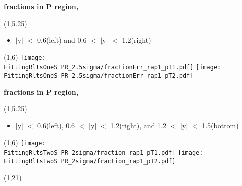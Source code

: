 \documentclass[11pt,slidescentered,red,compress,handout,hyperref={bookmarks=true},mathseriftable]{beamer}
\newcommand{\FittingRltsOneS}{../Psi1S/Fit/parameter/evaluateCtau/}
\newcommand{\FittingRltsTwoS}{../Psi2S/Fit/parameter/evaluateCtau/}
\begin{document}
\begin{frame}[t]{\small \bf fractions in P region,  }{}
\begin{textblock}{48}(1,5.25)
\begin{itemize}
\scriptsize \item  $|$y$|$ $<$ 0.6(left) and 0.6 $<$ $|$y$|$ $<$ 1.2(right)
\end{itemize}
\end{textblock}
\begin{textblock}{48}(1,6)
\hspace*{10pt} \texttt{[image: \\FittingRltsOneS PR\_2.5sigma/fractionErr\_rap1\_pT1.pdf]}
\hspace*{10pt} \texttt{[image: \\FittingRltsOneS PR\_2.5sigma/fractionErr\_rap1\_pT2.pdf]}
\end{textblock}
\end{frame}

\begin{frame}[t]{\small \bf fractions in P region,  }{}
\begin{textblock}{48}(1,5.25)
\begin{itemize}
\scriptsize \item  $|$y$|$ $<$ 0.6(left), 0.6 $<$ $|$y$|$ $<$ 1.2(right), and 1.2 $<$ $|$y$|$ $<$ 1.5(bottom)
\end{itemize}
\end{textblock}
\begin{textblock}{48}(1,6)
\hspace*{10pt} \texttt{[image: \\FittingRltsTwoS PR\_2sigma/fraction\_rap1\_pT1.pdf]}
\hspace*{10pt} \texttt{[image: \\FittingRltsTwoS PR\_2sigma/fraction\_rap1\_pT2.pdf]}
\begin{textblock}{48}(1,21)
\end{textblock}
\end{textblock}
\end{frame}
\end{document}
